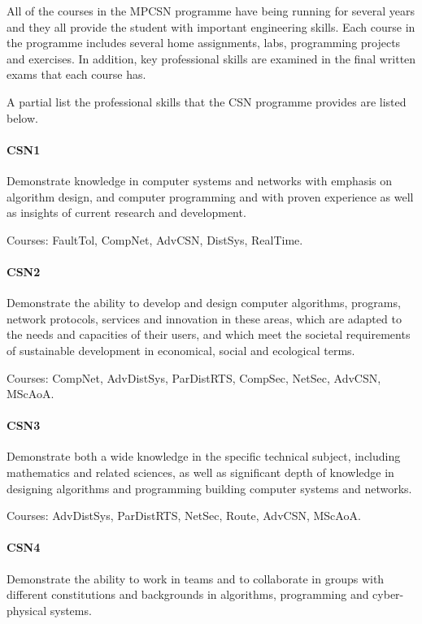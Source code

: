 
All of the courses in the MPCSN programme have being running for
several years and they all provide the student with important
engineering skills. Each course in the programme includes several home
assignments, labs, programming projects and exercises. In addition,
key professional skills are examined in the final written exams that
each course has.

A partial list the professional skills that the CSN programme provides
are listed below.

\paragraph{CSN1} Demonstrate knowledge in computer systems and
networks with emphasis on algorithm design, and computer programming
and with proven experience as well as insights of current research and
development.

Courses: FaultTol, CompNet, AdvCSN, DistSys, RealTime.

\paragraph{CSN2} Demonstrate the ability to develop and design
computer algorithms, programs, network protocols, services and
innovation in these areas, which are adapted to the needs and
capacities of their users, and which meet the societal requirements of
sustainable development in economical, social and ecological terms.

Courses: CompNet, AdvDistSys, ParDistRTS, CompSec, NetSec, AdvCSN,
MScAoA.

\paragraph{CSN3} Demonstrate both a wide knowledge in the specific
technical subject, including mathematics and related sciences, as well
as significant depth of knowledge in designing algorithms and
programming building computer systems and networks.

Courses: AdvDistSys, ParDistRTS, NetSec, Route, AdvCSN, MScAoA.

\paragraph{CSN4} Demonstrate the ability to work in teams and to
collaborate in groups with different constitutions and backgrounds in
algorithms, programming and cyber-physical systems.

